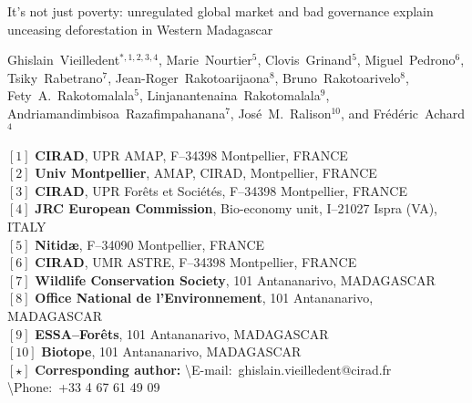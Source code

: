 \begin{center}
  \LARGE{It's not just poverty: unregulated global market and bad governance explain unceasing deforestation in Western Madagascar}
\end{center}

\vspace{1cm}

\begin{center}
  \large{Ghislain~Vieilledent$^{*,1,2,3,4}$, Marie~Nourtier$^5$, Clovis~Grinand$^5$, Miguel~Pedrono$^6$,     Tsiky~Rabetrano$^7$, Jean-Roger~Rakotoarijaona$^8$, Bruno~Rakotoarivelo$^8$, Fety~A.~Rakotomalala$^5$, 
  Linjanantenaina~Rakotomalala$^9$, Andriamandimbisoa~Razafimpahanana$^7$, 
  José~M.~Ralison$^{10}$, and Frédéric~Achard$^4$}
\end{center}

\vspace{1cm}

{\small
  \begin{flushleft}
    $[1]$ \textbf{CIRAD}, UPR AMAP, F--34398 Montpellier, FRANCE\\ 
    $[2]$ \textbf{Univ Montpellier}, AMAP, CIRAD, Montpellier, FRANCE\\
    $[3]$ \textbf{CIRAD}, UPR Forêts et Sociétés, F--34398 Montpellier, FRANCE\\
    $[4]$ \textbf{JRC European Commission}, Bio-economy unit, I--21027 Ispra (VA), ITALY\\
    $[5]$ \textbf{Nitid\ae}, F--34090 Montpellier, FRANCE\\
    $[6]$ \textbf{CIRAD}, UMR ASTRE, F--34398 Montpellier, FRANCE\\
    $[7]$ \textbf{Wildlife Conservation Society}, 101 Antananarivo, MADAGASCAR\\
    $[8]$ \textbf{Office National de l'Environnement}, 101 Antananarivo, MADAGASCAR\\
    $[9]$ \textbf{ESSA--Forêts}, 101 Antananarivo, MADAGASCAR\\
    $[10]$ \textbf{Biotope}, 101 Antananarivo, MADAGASCAR
    ~\\
    $[\star]$ \textbf{Corresponding author:}
    \textbackslash{E-mail}:~ghislain.vieilledent@cirad.fr
    \textbackslash{Phone}:~+33 4 67 61 49 09\\
  \end{flushleft}}
\newpage
